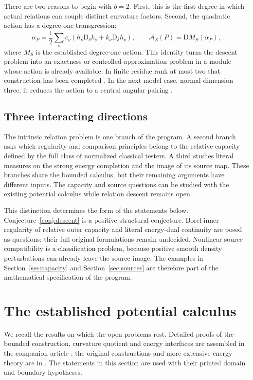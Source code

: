 \documentclass[11pt,a4paper]{article}
\newcommand{\MathSecref}[1]{{\hypersetup{linkcolor=SectionLink}Section~\ref{#1}}}
\newcommand{\Conjref}[1]{Conjecture~\ref{#1}}
\theoremstyle{definition}
\theoremstyle{remark}
\numberwithin{equation}{section}
\newcommand{\D}{\mathrm D}
\newcommand{\A}{\mathcal A}
\begin{document}
There are two reasons to begin with $b=2$.  First, this is the first
degree in which actual relations can couple distinct curvature factors.
Second, the quadratic action has a degree-one transgression:
\begin{equation}
 \alpha_P=\frac12\sum_\nu c_\nu
          (h_\nu\D_\delta k_\nu+k_\nu\D_\delta h_\nu),
 \qquad
 \A_S(P)=\D M_S(\alpha_P),
 \label{eq:intro-transgression}
\end{equation}
where $M_S$ is the established degree-one action.  This identity turns
the descent problem into an exactness or controlled-approximation
problem in a module whose action is already available.  In finite
residue rank at most two that construction has been completed
\cite{I11}.  In the next model case, normal dimension three, it reduces
the action to a central angular pairing \cite{I13}.

\subsection{Three interacting directions}

The intrinsic relation problem is one branch of the program.  A second
branch asks which regularity and comparison principles belong to the
relative capacity defined by the full class of normalized classical
testers.  A third studies literal measures on the strong energy
completion and the image of its source map.  These branches share the
bounded calculus, but their remaining arguments have different inputs.
The capacity and source questions can be studied with the existing
potential calculus while relation descent remains open.

This distinction determines the form of the statements below.
\Conjref{conj:descent} is a positive structural conjecture.  Borel
inner regularity of relative outer capacity and literal energy-dual
continuity are posed as questions: their full original formulations
remain undecided.  Nonlinear source compatibility is a classification
problem, because positive smooth density perturbations can already
leave the source image.  The examples in
\MathSecref{sec:capacity} and \MathSecref{sec:sources} are therefore
part of the mathematical specification of the program.

\section{The established potential calculus}
\label{sec:foundation}

We recall the results on which the open problems rest.  Detailed
proofs of the bounded construction, curvature quotient and energy
interfaces are assembled in the companion article \cite{Mature};
the original constructions and more extensive energy theory are in
\cite{R,B,Rchain}.  The statements in this section are used with their
printed domain and boundary hypotheses.
\end{document}
